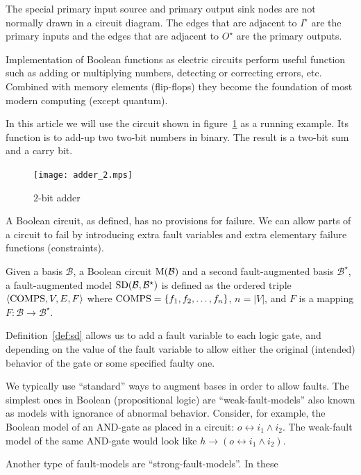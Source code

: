 \documentclass{article}
\begin{document}
%
The special primary input source and primary output sink nodes are not
normally drawn in a circuit diagram. The edges that are adjacent to
$I^\star$ are the primary inputs and the edges that are adjacent to
$O^\star$ are the primary outputs.
\par
Implementation of Boolean functions as electric circuits perform
useful function such as adding or multiplying numbers, detecting or
correcting errors, etc. Combined with memory elements (flip-flops)
they become the foundation of most modern computing (except quantum).
\par
In this article we will use the circuit shown in
figure~\ref{fig:adder} as a running example. Its function is to add-up
two two-bit numbers in binary. The result is a two-bit sum and a carry
bit.
%
\begin{figure}[htb]
\centering
\texttt{[image: adder\_2.mps]}
\caption{$2$-bit adder\label{fig:adder}}
\end{figure}
\par
%
A Boolean circuit, as defined, has no provisions for failure. We can
allow parts of a circuit to fail by introducing extra fault variables
and extra elementary failure functions (constraints).
%
\begin{definition}\label{def:sd}
  Given a basis $\mathcal{B}$, a Boolean circuit $\mathrm{M}(\mathcal{B})$
  and a second fault-augmented basis $\mathcal{B}^\star$, a
  fault-augmented model $\mathrm{SD}(\mathcal{B}, \mathcal{B^\star})$ is
  defined as the ordered triple $\langle{\ensuremath{\mathrm{COMPS}}, V, E, F}\rangle$
  where $\mathrm{COMPS} = \{f_1, f_2, \ldots, f_n\}$, $n = \left|V\right|$,
  and $F$ is a mapping $F: \mathcal{B} \rightarrow \mathcal{B}^\star$.
\end{definition}
%
Definition~\ref{def:sd} allows us to add a fault variable to each
logic gate, and depending on the value of the fault variable to allow
either the original (intended) behavior of the gate or some specified
faulty one.
\par
We typically use ``standard'' ways to augment bases in order to allow
faults. The simplest ones in Boolean (propositional logic) are
``weak-fault-models'' also known as models with ignorance of abnormal
behavior. Consider, for example, the Boolean model of an AND-gate as
placed in a circuit: $o \leftrightarrow i_1 \wedge i_2$. The
weak-fault model of the same AND-gate would look like $h \rightarrow
\left(o \leftrightarrow i_1 \wedge i_2\right)$.
\par
Another type of fault-models are ``strong-fault-models''. In these
\end{document}
